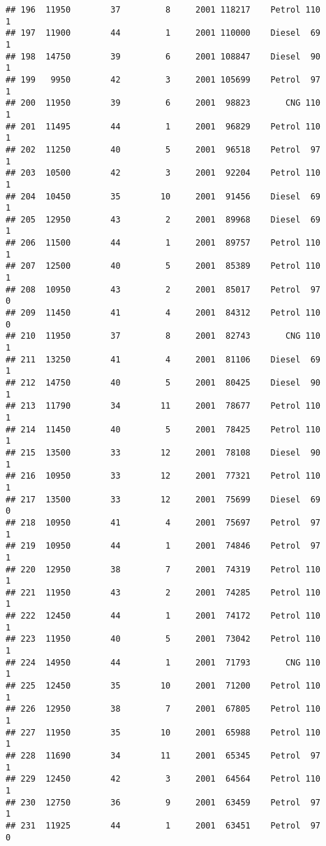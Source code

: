 \documentclass[]{article}
\begin{document}
\begin{verbatim}
## 196  11950        37         8     2001 118217    Petrol 110         1
## 197  11900        44         1     2001 110000    Diesel  69         1
## 198  14750        39         6     2001 108847    Diesel  90         1
## 199   9950        42         3     2001 105699    Petrol  97         1
## 200  11950        39         6     2001  98823       CNG 110         1
## 201  11495        44         1     2001  96829    Petrol 110         1
## 202  11250        40         5     2001  96518    Petrol  97         1
## 203  10500        42         3     2001  92204    Petrol 110         1
## 204  10450        35        10     2001  91456    Diesel  69         1
## 205  12950        43         2     2001  89968    Diesel  69         1
## 206  11500        44         1     2001  89757    Petrol 110         1
## 207  12500        40         5     2001  85389    Petrol 110         1
## 208  10950        43         2     2001  85017    Petrol  97         0
## 209  11450        41         4     2001  84312    Petrol 110         0
## 210  11950        37         8     2001  82743       CNG 110         1
## 211  13250        41         4     2001  81106    Diesel  69         1
## 212  14750        40         5     2001  80425    Diesel  90         1
## 213  11790        34        11     2001  78677    Petrol 110         1
## 214  11450        40         5     2001  78425    Petrol 110         1
## 215  13500        33        12     2001  78108    Diesel  90         1
## 216  10950        33        12     2001  77321    Petrol 110         1
## 217  13500        33        12     2001  75699    Diesel  69         0
## 218  10950        41         4     2001  75697    Petrol  97         1
## 219  10950        44         1     2001  74846    Petrol  97         1
## 220  12950        38         7     2001  74319    Petrol 110         1
## 221  11950        43         2     2001  74285    Petrol 110         1
## 222  12450        44         1     2001  74172    Petrol 110         1
## 223  11950        40         5     2001  73042    Petrol 110         1
## 224  14950        44         1     2001  71793       CNG 110         1
## 225  12450        35        10     2001  71200    Petrol 110         1
## 226  12950        38         7     2001  67805    Petrol 110         1
## 227  11950        35        10     2001  65988    Petrol 110         1
## 228  11690        34        11     2001  65345    Petrol  97         1
## 229  12450        42         3     2001  64564    Petrol 110         1
## 230  12750        36         9     2001  63459    Petrol  97         1
## 231  11925        44         1     2001  63451    Petrol  97         0

\end{verbatim}
\end{document}
